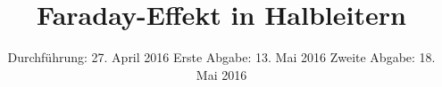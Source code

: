 

\subject{Fortgeschrittenen Praktikum - V46}
\title{Faraday-Effekt in Halbleitern}
\date{
  Durchführung: 27. April 2016
  \hspace{3em}
  Erste Abgabe: 13. Mai 2016
  Zweite Abgabe: 18. Mai 2016
}



\maketitle
\thispagestyle{empty}
\tableofcontents
\newpage






\printbibliography



